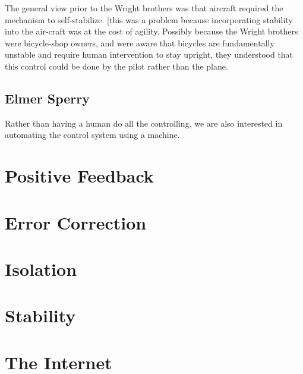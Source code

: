 
The general view prior to the Wright brothers was that aircraft required the mechanism to
self-stabilize. [this was a problem because incorporating stability into the air-craft was at the
cost of agility. Possibly because the Wright brothers were bicycle-shop owners, and were aware that
bicycles are fundamentally unstable and require human intervention to stay upright, they understood
that this control could be done by the pilot rather than the plane.

\subsection{Elmer Sperry}

Rather than having a human do all the controlling, we are also interested in automating the control
system using a machine.

\section{Positive Feedback}

\section{Error Correction}

\section{Isolation}

\section{Stability}

\section{The Internet}


